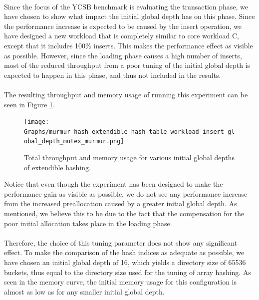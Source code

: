 \documentclass[11pt]{report} %
\begin{document}
\\
Since the focus of the YCSB benchmark is evaluating the transaction phase, we have chosen to show what impact the initial global depth has on this phase. Since the performance increase is expected to be caused by the insert operation, we have designed a new workload that is completely similar to core workload C, except that it includes 100\% inserts. This makes the performance effect as visible as possible. However, since the loading phase causes a high number of inserts, most of the reduced throughput from a poor tuning of the initial global depth is expected to happen in this phase, and thus not included in the results.\\
\\
The resulting throughput and memory usage of running this experiment can be seen in Figure \ref{fig:global_depht}.

\begin{figure}[H]
  \centering
  \texttt{[image: Graphs/murmur\_hash\_extendible\_hash\_table\_workload\_insert\_global\_depth\_mutex\_murmur.png]}\\
  \caption{Total throughput and memory usage for various initial global depths of extendible hashing.}\label{fig:global_depht}
\end{figure}

Notice that even though the experiment has been designed to make the performance gain as visible as possible, we do not see any performance increase from the increased preallocation caused by a greater initial global depth. As mentioned, we believe this to be due to the fact that the compensation for the poor initial allocation takes place in the loading phase.\\
\\
Therefore, the choice of this tuning parameter does not show any significant effect. To make the comparison of the hash indices as adequate as possible, we have chosen an initial global depth of 16, which yields a directory size of 65536 buckets, thus equal to the directory size used for the tuning of array hashing. As seen in the memory curve, the initial memory usage for this configuration is almost as low as for any smaller initial global depth.
\end{document}
